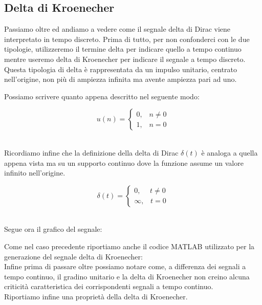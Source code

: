 \documentclass[../main.tex]{subfiles}
\begin{document}
\subsection{Delta di Kroenecher}

Passiamo oltre ed andiamo a vedere come il segnale delta di Dirac viene interpretato in tempo discreto. Prima di tutto, per non confonderci con le due tipologie, utilizzeremo il termine delta per indicare quello a tempo continuo mentre useremo delta di Kroenecher per indicare il segnale a tempo discreto.
Questa tipologia di delta è rappresentata da un impulso unitario, centrato nell'origine, non più di ampiezza infinita ma avente ampiezza pari ad uno.

Possiamo scrivere quanto appena descritto nel seguente modo:

\[ u(n) = \begin{cases}
 0, \hspace{10pt} n \neq 0 \\
 1, \hspace{10pt} n = 0
\end{cases}
\]\

Ricordiamo infine che la definizione della delta di Dirac $\delta(t)$ è analoga a quella appena vista ma su un supporto continuo dove la funzione assume un valore infinito nell'origine.

\[ \delta(t) = \begin{cases}
 0, \hspace{15pt} t \neq 0 \\
 \infty, \hspace{10pt} t = 0
\end{cases}
\]\

Segue ora il grafico del segnale:


Come nel caso precedente riportiamo anche il codice MATLAB utilizzato per la generazione del segnale delta di Kroenecher:\\



Infine prima di passare oltre possiamo notare come, a differenza dei segnali a tempo continuo, il gradino unitario e la delta di Kroenecher non creino alcuna criticità caratteristica dei corrispondenti segnali a tempo continuo.\\

Riportiamo infine una proprietà della delta di Kroenecher.
\end{document}
